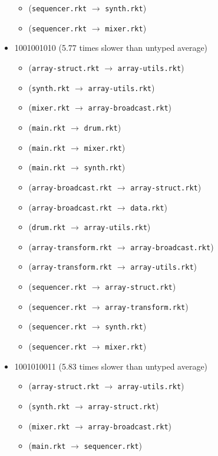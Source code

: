 \documentclass{article}
\newcommand{\mono}[1]{\texttt{#1}}
\begin{document}
\begin{itemize}
\begin{itemize}
  \item (\mono{sequencer.rkt} $\rightarrow$ \mono{synth.rkt})
  \item (\mono{sequencer.rkt} $\rightarrow$ \mono{mixer.rkt})
  \end{itemize}
\item 1001001010 (5.77 times slower than untyped average)
  \begin{itemize}
  \item (\mono{array-struct.rkt} $\rightarrow$ \mono{array-utils.rkt})
  \item (\mono{synth.rkt} $\rightarrow$ \mono{array-utils.rkt})
  \item (\mono{mixer.rkt} $\rightarrow$ \mono{array-broadcast.rkt})
  \item (\mono{main.rkt} $\rightarrow$ \mono{drum.rkt})
  \item (\mono{main.rkt} $\rightarrow$ \mono{mixer.rkt})
  \item (\mono{main.rkt} $\rightarrow$ \mono{synth.rkt})
  \item (\mono{array-broadcast.rkt} $\rightarrow$ \mono{array-struct.rkt})
  \item (\mono{array-broadcast.rkt} $\rightarrow$ \mono{data.rkt})
  \item (\mono{drum.rkt} $\rightarrow$ \mono{array-utils.rkt})
  \item (\mono{array-transform.rkt} $\rightarrow$ \mono{array-broadcast.rkt})
  \item (\mono{array-transform.rkt} $\rightarrow$ \mono{array-utils.rkt})
  \item (\mono{sequencer.rkt} $\rightarrow$ \mono{array-struct.rkt})
  \item (\mono{sequencer.rkt} $\rightarrow$ \mono{array-transform.rkt})
  \item (\mono{sequencer.rkt} $\rightarrow$ \mono{synth.rkt})
  \item (\mono{sequencer.rkt} $\rightarrow$ \mono{mixer.rkt})
  \end{itemize}
\item 1001010011 (5.83 times slower than untyped average)
  \begin{itemize}
  \item (\mono{array-struct.rkt} $\rightarrow$ \mono{array-utils.rkt})
  \item (\mono{synth.rkt} $\rightarrow$ \mono{array-struct.rkt})
  \item (\mono{mixer.rkt} $\rightarrow$ \mono{array-broadcast.rkt})
  \item (\mono{main.rkt} $\rightarrow$ \mono{sequencer.rkt})

\end{itemize}
\end{itemize}
\end{document}
